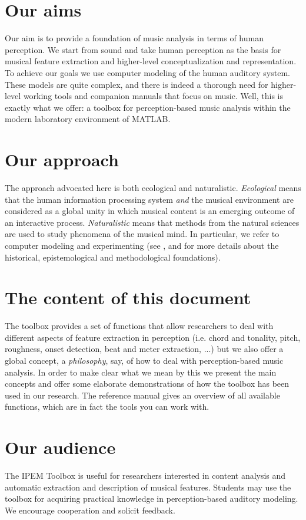 \section*{Our aims}
Our aim is to provide a foundation of music analysis in terms of
human perception. We start from sound and take human perception as
the basis for musical feature extraction and higher-level
conceptualization and representation. To achieve our goals we use
computer modeling of the human auditory system. These models are
quite complex, and there is indeed a thorough need for
higher-level working tools and companion manuals that focus on
music. Well, this is exactly what we offer: a toolbox for
perception-based music analysis within the modern laboratory
environment of MATLAB.

\section*{Our approach}
The approach advocated here is both ecological and naturalistic.
\emph{Ecological} means that the human information processing
system \emph{and} the musical environment are considered as a
global unity in which musical content is an emerging outcome of an
interactive process. \emph{Naturalistic} means that methods from
the natural sciences are used to study phenomena of the musical
mind. In particular, we refer to computer modeling and
experimenting (see , and
 for more details about
the historical, epistemological and methodological foundations).

\section*{The content of this document}
The toolbox provides a set of functions that allow researchers to
deal with different aspects of feature extraction in perception
(i.e. chord and tonality, pitch, roughness, onset detection, beat
and meter extraction, ...) but we also offer a global concept, a
\emph{philosophy}, say, of how to deal with perception-based music
analysis. In order to make clear what we mean by this we present
the main concepts and offer some elaborate demonstrations of how
the toolbox has been used in our research. The reference manual
gives an overview of all available functions, which are in fact
the tools you can work with.

\section*{Our audience}
The IPEM Toolbox is useful for researchers interested in content
analysis and automatic extraction and description of musical
features. Students may use the toolbox for acquiring practical
knowledge in perception-based auditory modeling. We encourage
cooperation and solicit feedback.

